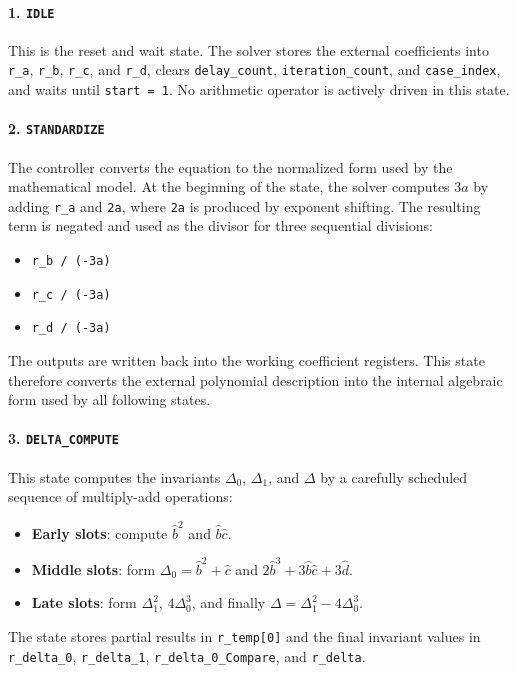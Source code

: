 \paragraph{1. \texttt{IDLE}}
This is the reset and wait state. The solver stores the external coefficients into \texttt{r\_a}, \texttt{r\_b}, \texttt{r\_c}, and \texttt{r\_d}, clears \texttt{delay\_count}, \texttt{iteration\_count}, and \texttt{case\_index}, and waits until \texttt{start = 1}. No arithmetic operator is actively driven in this state.

\paragraph{2. \texttt{STANDARDIZE}}
The controller converts the equation to the normalized form used by the mathematical model. At the beginning of the state, the solver computes $3a$ by adding \texttt{r\_a} and \texttt{2a}, where \texttt{2a} is produced by exponent shifting. The resulting term is negated and used as the divisor for three sequential divisions:
\begin{itemize}
    \item \texttt{r\_b / (-3a)}
    \item \texttt{r\_c / (-3a)}
    \item \texttt{r\_d / (-3a)}
\end{itemize}
The outputs are written back into the working coefficient registers. This state therefore converts the external polynomial description into the internal algebraic form used by all following states.

\paragraph{3. \texttt{DELTA\_COMPUTE}}
This state computes the invariants $\Delta_0$, $\Delta_1$, and $\Delta$ by a carefully scheduled sequence of multiply-add operations:
\begin{itemize}
    \item \textbf{Early slots}: compute $\hat{b}^2$ and $\hat{b}\hat{c}$.
    \item \textbf{Middle slots}: form $\Delta_0 = \hat{b}^2 + \hat{c}$ and $2\hat{b}^3 + 3\hat{b}\hat{c} + 3\hat{d}$.
    \item \textbf{Late slots}: form $\Delta_1^2$, $4\Delta_0^3$, and finally $\Delta = \Delta_1^2 - 4\Delta_0^3$.
\end{itemize}
The state stores partial results in \texttt{r\_temp[0]} and the final invariant values in \texttt{r\_delta\_0}, \texttt{r\_delta\_1}, \texttt{r\_delta\_0\_Compare}, and \texttt{r\_delta}.

